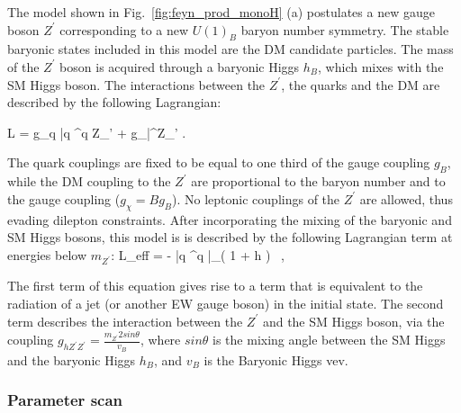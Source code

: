 The model shown in Fig.~\ref{fig:feyn_prod_monoH} (a)
postulates a new gauge boson $Z^\prime$ corresponding to a new $U(1)_B$ baryon 
number symmetry. The stable baryonic states included in this model are the DM candidate particles.
The mass of the $Z^\prime$ boson is acquired through a baryonic Higgs $h_B$, which mixes with the 
SM Higgs boson. The interactions between the $Z^\prime$, the quarks and the DM are described by 
the following Lagrangian:   

\be \label{ZprimeDM}
	L =  g_q  \bar q \gamma^\mu q  Z_\mu' +
%
	 g_\chi  \bar\chi \gamma^\mu \chi Z_\mu' .
\ee

The quark couplings \gq are fixed to be equal to one third of the gauge coupling $g_B$, 
while the DM coupling to the $Z^\prime$ are proportional to the baryon number and to the gauge coupling 
($g_{\chi} = B g_B$). No leptonic couplings of the $Z^\prime$ are allowed, thus evading dilepton constraints. 
After incorporating the mixing of the baryonic and SM Higgs bosons, this model is 
is described by the following Lagrangian term at energies below $m_{Z^\prime}$: 
 \be \label{U1Beft}
 L_{\rm eff} = -  \bar{q} \gamma^\mu q \bar\chi \gamma_\mu \chi \Big( 1 +  h \Big) \, ,
 \ee

The first term of this equation gives rise to a term that is equivalent to the 
radiation of a jet (or another EW gauge boson) in the initial state. 
The second term describes the interaction between the $Z^\prime$ and the SM Higgs boson,
via the coupling $g_{h Z^\prime Z^\prime} = \frac{m_{Z^\prime}2 sin\theta}{v_B}$, where
$sin\theta$ is the mixing angle between the SM Higgs and the baryonic Higgs $h_B$, and $v_B$ is the
Baryonic Higgs vev. 


\subsubsection{Parameter scan} 


